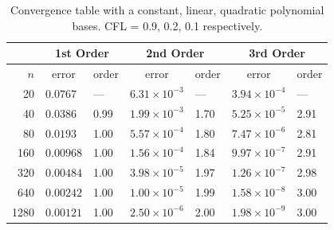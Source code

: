     \begin{table}
      \centering
      \begin{tabular}{r*{6}l}
        \toprule
        & \multicolumn{2}{c}{1st Order} & \multicolumn{2}{c}{2nd Order} & \multicolumn{2}{c}{3rd Order} \\
        \midrule
        \(n\) & \multicolumn{1}{c}{error} & order & \multicolumn{1}{c}{error} & order & \multicolumn{1}{c}{error} & order\\
        \midrule
          20 &  \(0.0767\) &  --- & \(6.31 \times 10^{-3}\) &  --- & \(3.94 \times 10^{-4}\) &  --- \\
          40 &  \(0.0386\) & 0.99 & \(1.99 \times 10^{-3}\) & 1.70 & \(5.25 \times 10^{-5}\) & 2.91 \\
          80 &  \(0.0193\) & 1.00 & \(5.57 \times 10^{-4}\) & 1.80 & \(7.47 \times 10^{-6}\) & 2.81 \\
         160 & \(0.00968\) & 1.00 & \(1.56 \times 10^{-4}\) & 1.84 & \(9.97 \times 10^{-7}\) & 2.91 \\
         320 & \(0.00484\) & 1.00 & \(3.98 \times 10^{-5}\) & 1.97 & \(1.26 \times 10^{-7}\) & 2.98 \\
         640 & \(0.00242\) & 1.00 & \(1.00 \times 10^{-5}\) & 1.99 & \(1.58 \times 10^{-8}\) & 3.00 \\
        1280 & \(0.00121\) & 1.00 & \(2.50 \times 10^{-6}\) & 2.00 & \(1.98 \times 10^{-9}\) & 3.00 \\
        \bottomrule
      \end{tabular}
      \caption{Convergence table with a constant, linear, quadratic polynomial bases.
       CFL = 0.9, 0.2, 0.1 respectively.}\label{tab:convergence_results}
    \end{table}


